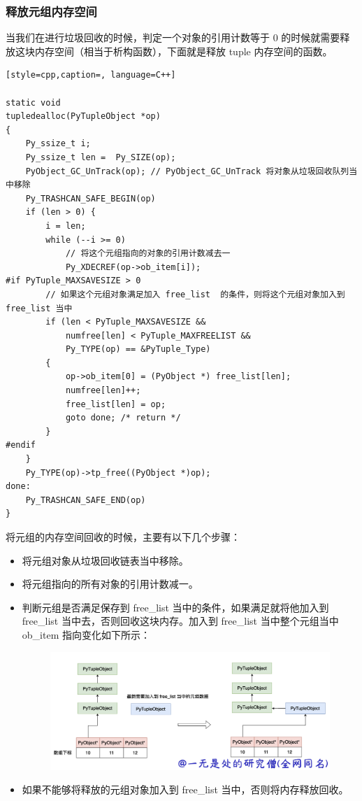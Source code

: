 \subsubsection{释放元组内存空间}
当我们在进行垃圾回收的时候，判定一个对象的引用计数等于 0 的时候就需要释放这块内存空间（相当于析构函数），下面就是释放 tuple 内存空间的函数。
\begin{lstlisting}[style=cpp,caption=, language=C++]

static void
tupledealloc(PyTupleObject *op)
{
    Py_ssize_t i;
    Py_ssize_t len =  Py_SIZE(op);
    PyObject_GC_UnTrack(op); // PyObject_GC_UnTrack 将对象从垃圾回收队列当中移除
    Py_TRASHCAN_SAFE_BEGIN(op) 
    if (len > 0) {
        i = len;
        while (--i >= 0)
            // 将这个元组指向的对象的引用计数减去一
            Py_XDECREF(op->ob_item[i]);
#if PyTuple_MAXSAVESIZE > 0
        // 如果这个元组对象满足加入 free_list  的条件，则将这个元组对象加入到 free_list 当中
        if (len < PyTuple_MAXSAVESIZE &&
            numfree[len] < PyTuple_MAXFREELIST &&
            Py_TYPE(op) == &PyTuple_Type)
        {
            op->ob_item[0] = (PyObject *) free_list[len];
            numfree[len]++;
            free_list[len] = op;
            goto done; /* return */
        }
#endif
    }
    Py_TYPE(op)->tp_free((PyObject *)op);
done:
    Py_TRASHCAN_SAFE_END(op)
}
\end{lstlisting}
将元组的内存空间回收的时候，主要有以下几个步骤：
\begin{itemize}
\item 将元组对象从垃圾回收链表当中移除。 
\item 将元组指向的所有对象的引用计数减一。 
\item 判断元组是否满足保存到 free\_list 当中的条件，如果满足就将他加入到 free\_list 当中去，否则回收这块内存。加入到 free\_list 当中整个元组当中 ob\_item 指向变化如下所示： 

    \begin{figure}[h]
        \centering
            \includegraphics[scale=.2]{images/11-tuple.png}
            \caption{ }
        \label{fig:my_label}
    \end{figure}
    
\item 如果不能够将释放的元组对象加入到 free\_list 当中，否则将内存释放回收。 
\end{itemize}
